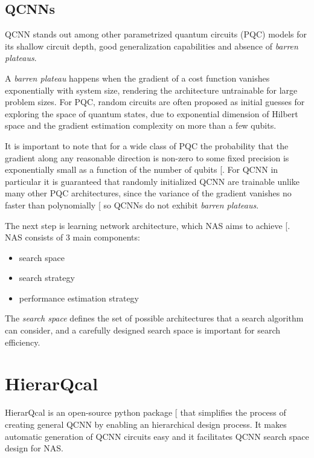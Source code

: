 \documentclass[
  13pt,
  a4paper,
  DIV=11,
  numbers=noendperiod,
  oneside]{scrreprt}
\providecommand{\tightlist}{%
  \setlength{\itemsep}{0pt}\setlength{\parskip}{0pt}}\usepackage{longtable,booktabs,array}
\begin{document}
\subsection{QCNNs}\label{qcnns}

QCNN stands out among other parametrized quantum circuits (PQC) models
for its shallow circuit depth, good generalization capabilities and
absence of \emph{barren plateaus}.

A \emph{barren plateau} happens when the gradient of a cost function
vanishes exponentially with system size, rendering the architecture
untrainable for large problem sizes. For PQC, random circuits are often
proposed as initial guesses for exploring the space of quantum states,
due to exponential dimension of Hilbert space and the gradient
estimation complexity on more than a few qubits.

It is important to note that for a wide class of PQC the probability
that the gradient along any reasonable direction is non-zero to some
fixed precision is exponentially small as a function of the number of
qubits {[}\citeproc{ref-McClean2018Nov}{3}{]}. For QCNN in particular it
is guaranteed that randomly initialized QCNN are trainable unlike many
other PQC architectures, since the variance of the gradient vanishes no
faster than polynomially {[}\citeproc{ref-Pesah2021Oct}{4}{]} so QCNNs
do not exhibit \emph{barren plateaus}.

The next step is learning network architecture, which NAS aims to
achieve {[}\citeproc{ref-elsken2019neural}{5}{]}. NAS consists of 3 main
components:

\begin{itemize}
\tightlist
\item
  search space
\item
  search strategy
\item
  performance estimation strategy
\end{itemize}

The \emph{search space} defines the set of possible architectures that a
search algorithm can consider, and a carefully designed search space is
important for search efficiency.

\section{HierarQcal}\label{hierarqcal}

HierarQcal is an open-source python package
{[}\citeproc{ref-github_hierarqcal}{6}{]} that simplifies the process of
creating general QCNN by enabling an hierarchical design process. It
makes automatic generation of QCNN circuits easy and it facilitates QCNN
search space design for NAS.
\end{document}
